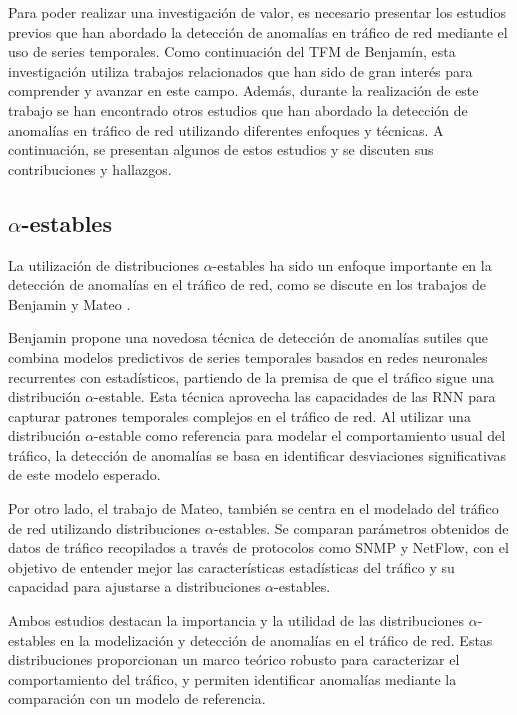 Para poder realizar una investigación de valor, es necesario presentar los estudios previos que han abordado la detección de anomalías en tráfico de red mediante el uso de series temporales. Como continuación del \ac{TFM} de Benjamín, esta investigación utiliza trabajos relacionados que han sido de gran interés para comprender y avanzar en este campo. Además, durante la realización de este trabajo se han encontrado otros estudios que han abordado la detección de anomalías en tráfico de red utilizando diferentes enfoques y técnicas. A continuación, se presentan algunos de estos estudios y se discuten sus contribuciones y hallazgos.

\subsection{$\alpha$-estables} %
La utilización de distribuciones $\alpha$-estables ha sido un enfoque importante en la detección de anomalías en el tráfico de red, como se discute en los trabajos de Benjamin \cite{benjamin2023} y Mateo \cite{mateo2013}.

Benjamin propone una novedosa técnica de detección de anomalías sutiles que combina modelos predictivos de series temporales basados en redes neuronales recurrentes con estadísticos, partiendo de la premisa de que el tráfico sigue una distribución $\alpha$-estable.
Esta técnica aprovecha las capacidades de las \ac{RNN} para capturar patrones temporales complejos en el tráfico de red. Al utilizar una distribución $\alpha$-estable como referencia para modelar el comportamiento usual del tráfico, la detección de anomalías se basa en identificar desviaciones significativas de este modelo esperado.

Por otro lado, el trabajo de Mateo, también se centra en el modelado del tráfico de red utilizando distribuciones $\alpha$-estables. Se comparan parámetros obtenidos de datos de tráfico recopilados a través de protocolos como SNMP y NetFlow, con el objetivo de entender mejor las características estadísticas del tráfico y su capacidad para ajustarse a distribuciones $\alpha$-estables.

Ambos estudios destacan la importancia y la utilidad de las distribuciones $\alpha$-estables en la modelización y detección de anomalías en el tráfico de red. Estas distribuciones proporcionan un marco teórico robusto para caracterizar el comportamiento del tráfico, y permiten identificar anomalías mediante la comparación con un modelo de referencia.

